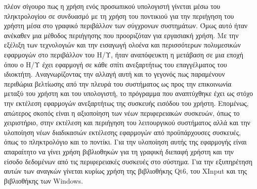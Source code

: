 



πλέον σίγουρο πως η χρήση ενός προσωπικού υπολογιστή γίνεται μέσω του
πληκτρολογίου σε συνδυασμό με τη χρήση του ποντικιού για την περιήγηση του
χρήστη μέσα στο γραφικό περιβάλλον των σύγχρονων συστημάτων. Όμως αυτό ήταν
ανέκαθεν μια μέθοδος περιήγησης που προοριζόταν για εργασιακή χρήση. Με την
εξέλιξη των τεχνολογιών και την εισαγωγή ολοένα και περισσότερων πολυμεσικών
εφαρμογών στο περιβάλλον του Η/Υ, ήταν αναπόφευκτη η μετάβαση σε μια εποχή
όπου ο Η/Υ έχει εφαρμογή σε κάθε σπίτι ανεξαρτήτως του επαγγέλματος του
ιδιοκτήτη. Αναγνωρίζοντας την αλλαγή αυτή και το γεγονός πως παραμένουν
περιθώρια βελτίωσης από την πλευρά του συστήματος ως προς την επικοινωνία
μεταξύ του χρήστη και του υπολογιστή, το πρόγραμμα που αναπτύχθηκε έχει ως στόχο την
εκτέλεση εφαρμογών ανεξαρτήτως της συσκευής εισόδου του χρήστη. Επομένως,
απώτερος σκοπός είναι η αξιοποίηση των νέων περιφερειακών συσκευών, όπως το χειριστήριο, στην
εκτέλεση και περιήγηση του λειτουργικού συστήματος αλλά και την υλοποίηση
νέων διαδικασιών εκτέλεσης εφαρμογών από προϋπάρχουσες συσκευές, όπως το
πληκτρολόγιο και το ποντίκι. Για την υλοποίηση αυτής της εφαρμογής είναι
απαραίτητο να γίνει χρήση βιβλιοθηκών για τη γραφική διεπαφή χρήστη και την
είσοδο δεδομένων από τις περιφερειακές συσκευές στο σύστημα. Για την
εξυπηρέτηση αυτών των αναγκών γίνεται κυρίως χρήση της βιβλιοθήκης Qt6, του
XInput και της βιβλιοθήκης των Windows.






